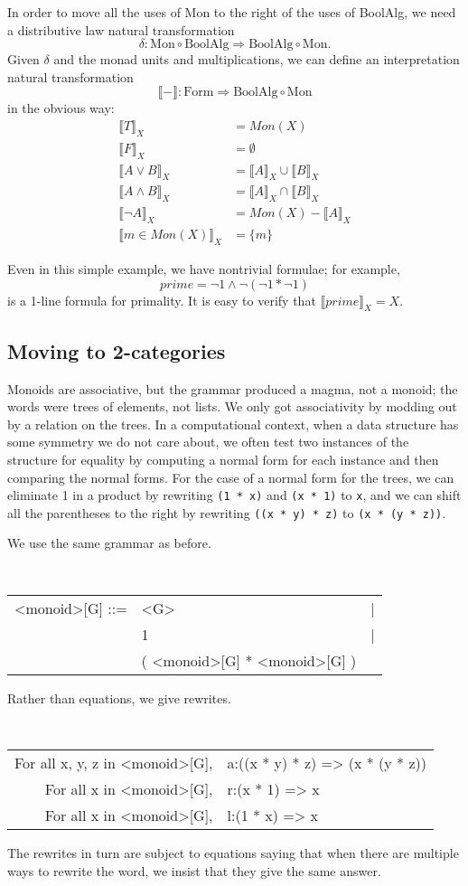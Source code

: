 \documentclass{article}
\newcommand{\interp}[1]{\llbracket #1 \rrbracket}
\newcommand{\maps}{\colon}
\newcommand{\Mon}{\mathrm{Mon}}
\newcommand{\BoolAlg}{\mathrm{BoolAlg}}
\newcommand{\Form}{\mathrm{Form}}
\begin{document}
In order to move all the uses of Mon to the right of the uses of BoolAlg, we need a distributive law natural transformation
\[ \delta\maps \Mon \circ \BoolAlg \Rightarrow \BoolAlg \circ \Mon. \]
Given $\delta$ and the monad units and multiplications, we can define an interpretation natural transformation
\[ \interp{-}\maps \Form\Rightarrow \BoolAlg \circ \Mon \]
in the obvious way:
\begin{align*}
  \interp{T}_X &= Mon(X)\\
  \interp{F}_X &= \emptyset\\
  \interp{{A}\lor{B}}_X &= \interp{A}_X \cup \interp{B}_X\\
  \interp{{A}\land{B}}_X &= \interp{A}_X \cap \interp{B}_X\\
  \interp{\neg A}_X &= Mon(X) - \interp{A}_X\\
  \interp{m \in Mon(X)}_X &= \{m\}
\end{align*}

Even in this simple example, we have nontrivial formulae; for example,
\[ prime = \neg 1 \land \neg(\neg 1 * \neg 1) \]
is a 1-line formula for primality.  It is easy to verify that $\interp{prime}_X = X.$

\subsection{Moving to 2-categories}

Monoids are associative, but the grammar produced a magma, not a monoid; the words were trees of elements, not lists.  We only got associativity by modding out by a relation on the trees.  In a computational context, when a data structure has some symmetry we do not care about, we often test two instances of the structure for equality by computing a normal form for each instance and then comparing the normal forms.  For the case of a normal form for the trees, we can eliminate 1 in a product by rewriting {\tt (1 * x)} and {\tt (x * 1)} to {\tt x}, and we can shift all the parentheses to the right by rewriting {\tt ((x * y) * z)} to {\tt (x * (y * z))}.  

We use the same grammar as before.
\begin{center}
  \tt
  \begin{tabular}{rll}
    <monoid>[G] ::= & <G> &|\\
    & 1 &|\\
    & ( <monoid>[G] * <monoid>[G] )
  \end{tabular}
\end{center}
Rather than equations, we give rewrites.
\begin{center}
  \tt \small
  \begin{tabular}{rl}
    For all x, y, z in <monoid>[G], & a:((x * y) * z) => (x * (y * z))\\
    For all x in <monoid>[G], & r:(x * 1) => x\\
    For all x in <monoid>[G], & l:(1 * x) => x
  \end{tabular}
\end{center}
The rewrites in turn are subject to equations saying that when there are multiple ways to rewrite the word, we insist that they give the same answer.
\end{document}
